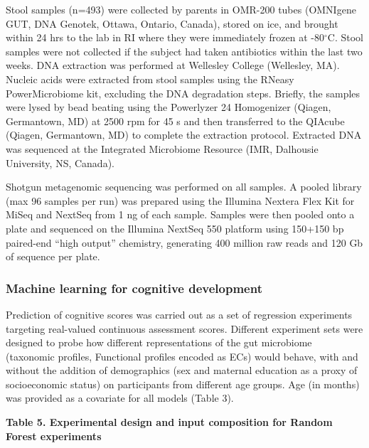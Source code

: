 \documentclass{article}
\begin{document}
Stool samples (n=493) were collected by parents in OMR-200 tubes
(OMNIgene GUT, DNA Genotek, Ottawa, Ontario, Canada), stored on ice, and
brought within 24 hrs to the lab in RI where they were immediately
frozen at -80$^{\circ}$C. Stool samples were not collected if the subject had
taken antibiotics within the last two weeks. DNA extraction was
performed at Wellesley College (Wellesley, MA). Nucleic acids were
extracted from stool samples using the RNeasy PowerMicrobiome kit,
excluding the DNA degradation steps. Briefly, the samples were lysed by
bead beating using the Powerlyzer 24 Homogenizer (Qiagen, Germantown,
MD) at 2500 rpm for 45 s and then transferred to the QIAcube (Qiagen,
Germantown, MD) to complete the extraction protocol. Extracted DNA was
sequenced at the Integrated Microbiome Resource (IMR, Dalhousie
University, NS, Canada).

Shotgun metagenomic sequencing was performed on all samples. A pooled
library (max 96 samples per run) was prepared using the Illumina Nextera
Flex Kit for MiSeq and NextSeq from 1 ng of each sample. Samples were
then pooled onto a plate and sequenced on the Illumina NextSeq 550
platform using 150+150 bp paired-end ``high output'' chemistry,
generating 400 million raw reads and 120 Gb of sequence per plate.

\subsubsection*{Machine learning for cognitive development}

Prediction of cognitive scores was carried out as a set of regression
experiments targeting real-valued continuous assessment scores.
Different experiment sets were designed to probe how different
representations of the gut microbiome (taxonomic profiles, Functional
profiles encoded as ECs) would behave, with and without the addition of
demographics (sex and maternal education as a proxy of socioeconomic
status) on participants from different age groups. Age (in months) was
provided as a covariate for all models (Table 3).

\textbf{Table 5. Experimental design and input composition for Random
Forest experiments}
\end{document}
